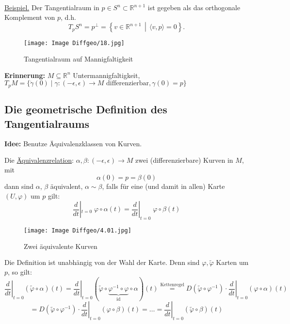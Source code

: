 \documentclass[fleqn, 12pt, letterpaper]{article}
\begin{document}
\medskip

\underline{Beispiel.} Der Tangentialraum in \( p \in S^n \subset \mathbb{R}^{n+1} \) ist gegeben als das orthogonale Komplement von \( p \), d.h.
\[
T_p S^n = p^\perp = \left\{ v \in \mathbb{R}^{n+1} \,\middle|\, \langle v, p \rangle = 0 \right\}.
\]
\begin{figure}[H]
  \centering
  \texttt{[image: Image Diffgeo/18.jpg]}
\caption{Tangentialraum auf Mannigfaltigkeit}
\end{figure}

\textbf{Erinnerung:} $M \subseteq \mathbb{R}^n$ Untermannigfaltigkeit, \quad 
$T_pM = \{ \dot{\gamma}(0) \mid \gamma : (-\epsilon, \epsilon) \to M \text{ differenzierbar}, \gamma(0) = p \}$
\subsection{Die geometrische Definition des Tangentialraums}

\textbf{Idee:} Benutze Äquivalenzklassen von Kurven.

\medskip

Die \underline{Äquivalenzrelation}: $\alpha, \beta : (-\epsilon, \epsilon) \to M$ zwei (differenzierbare) Kurven in $M$, mit
\[
\alpha(0)=p=\beta(0)
\]
dann sind $\alpha$, $\beta$ äquivalent, $\alpha \sim \beta$, falls für eine (und damit in allen) Karte $(U, \varphi)$ um $p$ gilt:
\[
\frac{d}{dt}|_{t=0}\;\varphi \circ \alpha(t)= \frac{d}{dt}|_{t=0}\;\varphi\circ\beta(t)
\]

\begin{figure}[H]
  \centering
  \texttt{[image: Image Diffgeo/4.01.jpg]}
\caption{Zwei äquivalente Kurven}
\end{figure}

Die Definition ist unabhängig von der Wahl der Karte. Denn sind $\varphi, \tilde{\varphi}$ Karten um $p$, so gilt:
\[
\left. \frac{d}{dt} \right|_{t=0} (\tilde{\varphi} \circ \alpha)(t) = 
\left. \frac{d}{dt} \right|_{t=0} (\tilde{\varphi} \circ \underbrace{\varphi^{-1} \circ \varphi}_{\mathrm{id}} \circ \alpha)(t)
\overset{\text{Kettenregel}}{=} 
D(\tilde{\varphi} \circ \varphi^{-1}) \cdot \left. \frac{d}{dt} \right|_{t=0} (\varphi \circ \alpha)(t)
\]
\[
= D(\tilde{\varphi} \circ \varphi^{-1}) \cdot \left. \frac{d}{dt} \right|_{t=0} (\varphi \circ \beta)(t)
= \dots = \left. \frac{d}{dt} \right|_{t=0} (\tilde{\varphi} \circ \beta)(t)
\]
\end{document}
